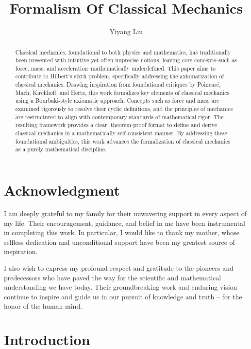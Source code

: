 \documentclass[12pt]{amsart}
\begin{document}
\title{Formalism Of Classical Mechanics}
\author{Yiyang Liu}


\begin{abstract}
Classical mechanics, foundational to both physics and mathematics, has traditionally been presented with intuitive yet often imprecise notions, leaving core concepts--such as force, mass, and acceleration--mathematically underdefined. This paper aims to contribute to Hilbert's sixth problem, specifically addressing the axiomatization of classical mechanics. Drawing inspiration from foundational critiques by Poincaré, Mach, Kirchhoff, and Hertz, this work formalizes key elements of classical mechanics using a Bourbaki-style axiomatic approach. Concepts such as force and mass are examined rigorously to resolve their cyclic definitions, and the principles of mechanics are restructured to align with contemporary standards of mathematical rigor. The resulting framework provides a clear, theorem-proof format to define and derive classical mechanics in a mathematically self-consistent manner. By addressing these foundational ambiguities, this work advances the formalization of classical mechanics as a purely mathematical discipline.
\end{abstract}



\maketitle

\section*{Acknowledgment}
I am deeply grateful to my family for their unwavering support in every aspect of my life. Their encouragement, guidance, and belief in me have been instrumental in completing this work. In particular, I would like to thank my mother, whose selfless dedication and unconditional support have been my greatest source of inspiration. 

I also wish to express my profound respect and gratitude to the pioneers and predecessors who have paved the way for the scientific and mathematical understanding we have today. Their groundbreaking work and enduring vision continue to inspire and guide us in our pursuit of knowledge and truth -- for the honor of the human mind.

\tableofcontents


\newpage
\section{Introduction}
\end{document}
